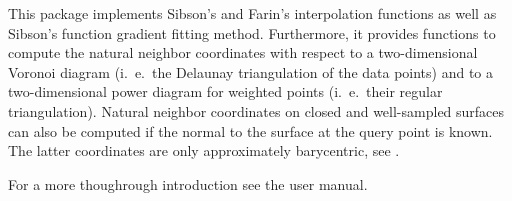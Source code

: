 This package implements Sibson's and Farin's interpolation functions
as well as Sibson's function gradient fitting method. Furthermore, it
provides functions to compute the natural neighbor coordinates with
respect to a two-dimensional Voronoi diagram (i.\ e.\ the Delaunay
triangulation of the data points) and to a two-dimensional power
diagram for weighted points (i.\ e.\ their regular triangulation).
Natural neighbor coordinates on closed and well-sampled surfaces can
also be computed if the normal to the surface at the query point is
known. The latter coordinates are only approximately barycentric, see
\cite{bf-lcss-02}.

For a more thoughrough introduction see the user manual.

\\
\\


 \\
 \\
 \\
 \\
 \\

 \\
 \\

 \\
 \\
 \\
\clearpage

